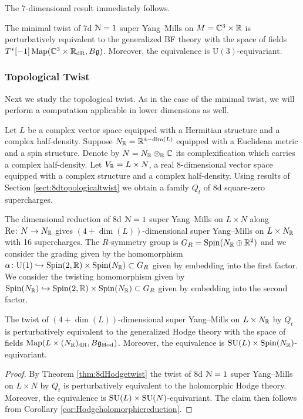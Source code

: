 \documentclass[10pt, oneside]{article}
\newcommand{\Hod}{\mathrm{Hod}}
\renewcommand{\Re}{\mathrm{Re}}
\renewcommand{\U}{\mathrm{U}}
\begin{document}
The 7-dimensional result immediately follows.

\begin{theorem}
The minimal twist of 7d $\mathcal N=1$ super Yang--Mills on $M=\mathbb C^3\times \mathbb R$ is perturbatively equivalent to the generalized BF theory with the space of fields $T^*[-1]\operatorname{Map}(\mathbb C^3\times \mathbb R_{\mathrm{dR}}, B\mathfrak g)$. Moreover, the equivalence is $\U(3)$-equivariant.
\label{thm:7dminimaltwist}
\end{theorem}

\subsubsection{Topological Twist}
\label{sect:7dtopologicaltwist}

Next we study the topological twist. As in the case of the minimal twist, we will perform a computation applicable in lower dimensions as well.

Let $L$ be a complex vector space equipped with a Hermitian structure and a complex half-density. Suppose $N_\mathbb R = \mathbb R^{4-\dim(L)}$ equipped with a Euclidean metric and a spin structure. Denote by $N=N_\mathbb R\otimes_\mathbb R\mathbb C$ its complexification which carries a complex half-density. Let $V_\mathbb R=L\times N$, a real 8-dimensional vector space equipped with a complex structure and a complex half-density. Using results of Section \ref{sect:8dtopologicaltwist} we obtain a family $Q_t$ of 8d square-zero supercharges.

The dimensional reduction of 8d $\mathcal N=1$ super Yang--Mills on $L\times N$ along $\Re\colon N\rightarrow N_\RR$ gives $(4+\dim(L))$-dimensional super Yang--Mills on $L\times N_\mathbb R$ with 16 supercharges. The $R$-symmetry group is $G_R=\mathrm{Spin}(N_\mathbb R\oplus \mathbb R^2)$ and we consider the grading given by the homomorphism $\alpha\colon\U(1)\hookrightarrow \Spin(2, \RR)\times \Spin(N_\RR)\subset G_R$ given by embedding into the first factor. We consider the twisting homomorphism given by $\mathrm{Spin}(N_\mathbb R)\hookrightarrow \mathrm{Spin}(2, \mathbb R)\times \mathrm{Spin}(N_\mathbb R)\subset G_R$ given by embedding into the second factor.

\begin{theorem}
The twist of $(4+\dim(L))$-dimensional super Yang--Mills on $L\times N_\mathbb R$ by $Q_t$ is perturbatively equivalent to the generalized Hodge theory with the space of fields $\map(L\times (N_\RR)_{\mr{dR}}, B\fg_\Hod)$. Moreover, the equivalence is $\mathrm{SU}(L)\times \mathrm{Spin}(N_\mathbb R)$-equivariant.
\label{thm:8dHodgereduction}
\end{theorem}
\begin{proof}
By Theorem \ref{thm:8dHodgetwist} the twist of 8d $\mathcal N=1$ super Yang--Mills on $L\times N$ by $Q_t$ is perturbatively equivalent to the holomorphic Hodge theory. Moreover, the equivalence is $\mathrm{SU}(L)\times \mathrm{SU}(N)$-equivariant. The claim then follows from Corollary \ref{cor:Hodgeholomorphicreduction}.
\end{proof}
\end{document}
